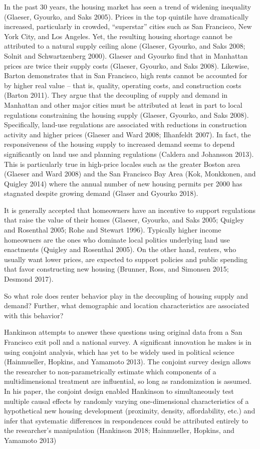 \documentclass[]{article}
\begin{document}
In the past 30 years, the housing market has seen a trend of widening inequality (Glaeser, Gyourko, and Saks 2005). Prices in the top quintile have dramatically increased, particularly in crowded, ``superstar'' cities such as San Francisco, New York City, and Los Angeles. Yet, the resulting housing shortage cannot be attributed to a natural supply ceiling alone (Glaeser, Gyourko, and Saks 2008; Solnit and Schwartzenberg 2000). Glaeser and Gyourko find that in Manhattan prices are twice their supply costs (Glaeser, Gyourko, and Saks 2008). Likewise, Barton demonstrates that in San Francisco, high rents cannot be accounted for by higher real value -- that is, quality, operating costs, and construction costs (Barton 2011). They argue that the decoupling of supply and demand in Manhattan and other major cities must be attributed at least in part to local regulations constraining the housing supply (Glaeser, Gyourko, and Saks 2008). Specifically, land-use regulations are associated with reductions in construction activity and higher prices (Glaeser and Ward 2008; Ilhanfeldt 2007). In fact, the responsiveness of the housing supply to increased demand seems to depend significantly on land use and planning regulations (Caldera and Johansson 2013). This is particularly true in high-price locales such as the greater Boston area (Glaeser and Ward 2008) and the San Francisco Bay Area (Kok, Monkkonen, and Quigley 2014) where the annual number of new housing permits per 2000 has stagnated despite growing demand (Glaser and Gyourko 2018).

It is generally accepted that homeowners have an incentive to support regulations that raise the value of their homes (Glaeser, Gyourko, and Saks 2005; Quigley and Rosenthal 2005; Rohe and Stewart 1996). Typically higher income homeowners are the ones who dominate local politics underlying land use enactments (Quigley and Rosenthal 2005). On the other hand, renters, who usually want lower prices, are expected to support policies and public spending that favor constructing new housing (Brunner, Ross, and Simonsen 2015; Desmond 2017).

So what role does renter behavior play in the decoupling of housing supply and demand? Further, what demographic and location characteristics are associated with this behavior?

Hankinson attempts to answer these questions using original data from a San Francisco exit poll and a national survey. A significant innovation he makes is in using conjoint analysis, which has yet to be widely used in political science (Hainmueller, Hopkins, and Yamamoto 2013). The conjoint survey design allows the researcher to non-parametrically estimate which components of a multidimensional treatment are influential, so long as randomization is assumed. In his paper, the conjoint design enabled Hankinson to simultaneously test multiple causal effects by randomly varying one-dimensional characteristics of a hypothetical new housing development (proximity, density, affordability, etc.) and infer that systematic differences in respondences could be attributed entirely to the researcher's manipulation (Hankinson 2018; Hainmueller, Hopkins, and Yamamoto 2013)
\end{document}
